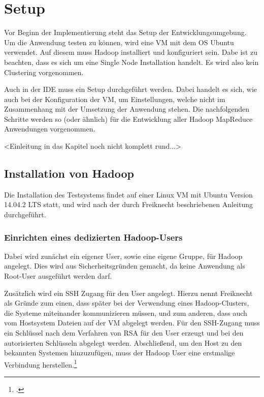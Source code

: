 
\chapter{Setup}\label{cha:Setup}
Vor Beginn der Implementierung steht das Setup der Entwicklungsumgebung. Um die Anwendung testen zu können, wird eine \ac{VM} mit dem \ac{OS} Ubuntu verwendet. Auf diesem muss Hadoop installiert und konfiguriert sein. Dabe ist zu beachten, dass es sich um eine Single Node Installation handelt. Es wird also kein Clustering vorgenommen.

Auch in der \ac{IDE} muss ein Setup durchgeführt werden. Dabei handelt es sich, wie auch bei der Konfiguration der \ac{VM}, um Einstellungen, welche nicht im Zusammenhang mit der Umsetzung der Anwendung stehen. Die nachfolgenden Schritte werden so (oder ähnlich) für die Entwicklung aller Hadoop MapReduce Anwendungen vorgenommen.

<Einleitung in das Kapitel noch nicht komplett rund...>

\section{Installation von Hadoop}\label{sec:InstallationHadoop}
Die Installation des Testsystems findet auf einer Linux \ac{VM} mit Ubuntu Version 14.04.2 \ac{LTS} statt, und wird nach der durch Freiknecht beschriebenen Anleitung durchgeführt. 

\subsection{Einrichten eines dedizierten Hadoop-Users}
Dabei wird zunächst ein eigener User, sowie eine eigene Gruppe, für Hadoop angelegt. Dies wird aus Sicherheitsgründen gemacht, da keine Anwendung als Root-User ausgeführt werden darf.

Zusätzlich wird ein \ac{SSH} Zugang für den User angelegt. Hierzu nennt Freiknecht als Gründe zum einen, dass später bei der Verwendung eines Hadoop-Clusters, die Systeme miteinander kommunizieren müssen, und zum anderen, dass auch vom Hostsystem Dateien auf der \ac{VM} abgelegt werden. Für den \ac{SSH}-Zugang muss ein Schlüssel nach dem Verfahren von \ac{RSA} für den User erzeugt und bei den autorisierten Schlüsseln abgelegt werden. Abschließend, um den Host zu den bekannten Systemen hinzuzufügen, muss der Hadoop User eine erstmalige Verbindung herstellen.\footcite[Vgl.][S. 30 f.]{Freiknecht.2014}

